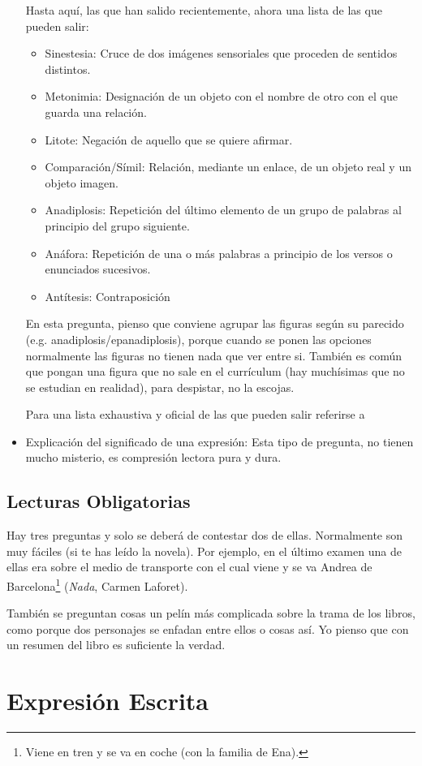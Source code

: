 \documentclass[arial,a4paper,print]{article}
\begin{document}
\begin{itemize}
Hasta aquí, las que han salido recientemente, ahora una lista de las que pueden salir:
\begin{itemize}
	\item Sinestesia: Cruce de dos imágenes sensoriales que proceden de sentidos distintos. 
	\item Metonimia: Designación de un objeto con el nombre de otro con el que guarda una relación. 
	\item Litote: Negación de aquello que se quiere afirmar. 
	\item Comparación/Símil: Relación, mediante un enlace, de un objeto real y un objeto imagen. 
	\item Anadiplosis: Repetición del último elemento de un grupo de palabras al principio del grupo siguiente.
	\item Anáfora: Repetición de una o más palabras a principio de los versos o enunciados sucesivos.
	\item Antítesis: Contraposición
\end{itemize}
En esta pregunta, pienso que conviene agrupar las figuras según su parecido (e.g. anadiplosis/epanadiplosis), porque cuando se ponen las opciones normalmente las figuras no tienen nada que ver entre si. También es común que pongan una figura que no sale en el currículum (hay muchísimas que no se estudian en realidad), para despistar, no la escojas. 

Para una lista exhaustiva y oficial de las que pueden salir referirse a  

\item Explicación del significado de una expresión: Esta tipo de pregunta, no tienen mucho misterio, es compresión lectora pura y dura. 
\end{itemize}

\subsection{Lecturas Obligatorias}
Hay tres preguntas y solo se deberá de contestar dos de ellas. Normalmente son muy fáciles (si te has leído la novela). Por ejemplo, en el último examen una de ellas era sobre el medio de transporte con el cual viene y se va Andrea de Barcelona\footnote{Viene en tren y se va en coche (con la familia de Ena).} (\textit{Nada}, Carmen Laforet). 

También se preguntan cosas un pelín más complicada sobre la trama de los libros, como porque dos personajes se enfadan entre ellos o cosas así. Yo pienso que con un resumen del libro es suficiente la verdad. 

\section{Expresión Escrita}

	
\end{document}
